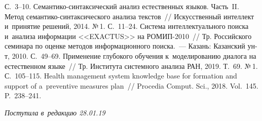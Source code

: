 \begin{multicols}{2}
{{\begin{thebibliography}{99}
С.~3--10.
Семантико-синтаксический анализ естественных языков. Часть~II. Метод 
се\-ман\-ти\-ко-син\-так\-си\-че\-ско\-го анализа текстов~// Искусственный интеллект 
и~принятие решений, 2014. №\,1. С.~11--24.
Система интеллектуального поиска и~анализа информации <<EXACTUS>> на  
\mbox{РОМИП}-2010~// Тр. Российского семинара по оценке методов 
информационного поиска.~--- Казань: Казанский ун-т, 2010. 
С.~49--69.
   Применение 
глубокого обучения к~моделированию диалога на естественном языке~// Тр. 
Института системного анализа РАН, 2019. Т.~69. №\,1. С.~105--115.
   Health management system knowledge base for formation and 
support of a~preventive measures plan~// Procedia Comput. Sci., 2018. 
Vol.~145. P.~238--241.
  \end{thebibliography}

 }
 }

\end{multicols}

\vspace*{-6pt}

\hfill{\small\textit{Поступила в~редакцию 28.01.19}}



\newpage

\vspace*{-28pt}





\def\tit{PERSONAL COGNITIVE ASSISTANT:\\ CONCEPT AND~KEY 
PRINCIPALS}


\def\titkol{Personal cognitive assistant: Concept and~key 
principals}

\def\aut{I.\,V.~Smirnov$^{1,2}$, A.\,I.~Panov$^{1,3}$, 
  A.\,A.~Skrynnik$^1$, %
  and~E.\,V.~Chistova$^{1,2}$}

